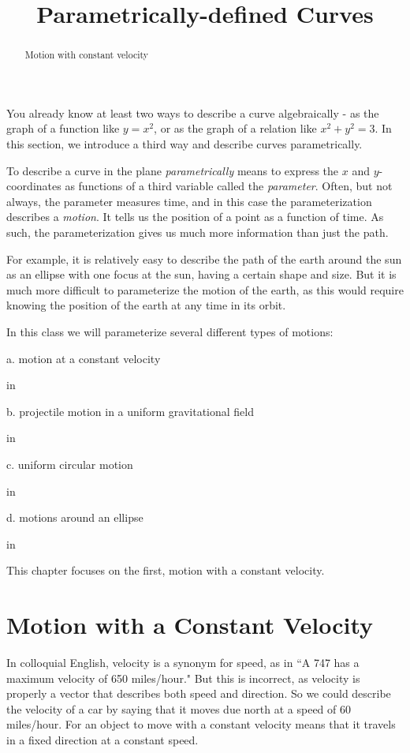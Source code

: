 \documentclass{ximera}
\title{Parametrically-defined Curves}
\newcommand{\pskip}{\vskip 0.1 in}
\begin{document}
\begin{abstract}
Motion with constant velocity
\end{abstract}
\maketitle

You already know at least two ways to describe a curve algebraically - as  the graph of a function like $y=x^2$, or as the graph of a relation like $x^2 + y^2 = 3$. In this section, we introduce a third way and describe curves parametrically. 

To describe a curve in the plane \emph{parametrically} means to express the $x$ and $y$-coordinates as functions of a third variable called the \emph{parameter}. Often, but not always, the parameter measures time, and in this case the parameterization describes a \emph{motion}. It tells us the position of a point as a function of time. As such, the parameterization gives us much more information than just the path.%

For example, it is relatively easy to describe the path of the earth around the sun as an ellipse with one focus at the sun, having a certain shape and size. But it is much more difficult to parameterize the motion of the earth, as this would require knowing the position of the earth at any time in its orbit.

In this class we will parameterize several different types of motions:

a. motion at a constant velocity

\pskip

b. projectile motion in a uniform gravitational field

\pskip

c. uniform circular motion

\pskip

d. motions around an ellipse

\pskip

This chapter focuses on the first, motion with a constant velocity.

\section{Motion with a Constant Velocity}

In colloquial English, velocity is a synonym for speed, as in ``A 747 has a maximum velocity of 650 miles/hour." But this is incorrect, as velocity is properly a vector that describes both speed and direction. So we could describe the velocity of a car by saying that it moves due north at a speed of 60 miles/hour. For an object to move with a constant velocity means that it travels in a fixed direction at a constant speed.
\end{document}
